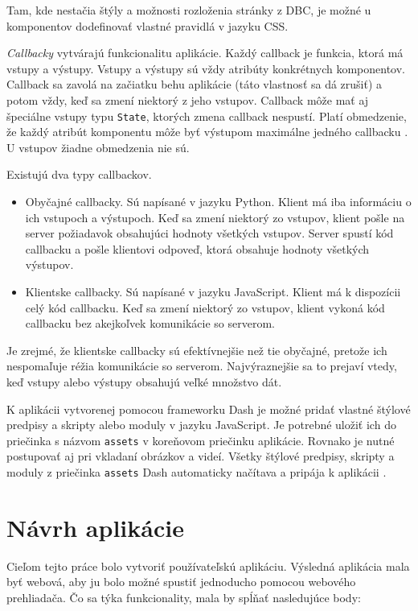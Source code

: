 Tam, kde nestačia štýly a možnosti rozloženia stránky z DBC, je možné u komponentov dodefinovať vlastné pravidlá v jazyku CSS.

\emph{Callbacky} vytvárajú funkcionalitu aplikácie. Každý callback je funkcia, ktorá má vstupy a výstupy. Vstupy a výstupy sú vždy atribúty konkrétnych komponentov. Callback sa zavolá na začiatku behu aplikácie (táto vlastnosť sa dá zrušiť) a potom vždy, keď sa zmení niektorý z jeho vstupov. Callback môže mať aj špeciálne vstupy typu \texttt{State}, ktorých zmena callback nespustí. Platí obmedzenie, že každý atribút komponentu môže byť výstupom maximálne jedného callbacku \cite{dash_documentation}. U vstupov žiadne obmedzenia nie sú.

Existujú dva typy callbackov.
\begin{itemize}
    \item Obyčajné callbacky. Sú napísané v jazyku Python. Klient má iba informáciu o ich vstupoch a výstupoch. Keď sa zmení niektorý zo vstupov, klient pošle na server požiadavok obsahujúci hodnoty všetkých vstupov. Server spustí kód callbacku a pošle klientovi odpoveď, ktorá obsahuje hodnoty všetkých výstupov.
    \item Klientske callbacky. Sú napísané v jazyku JavaScript. Klient má k dispozícii celý kód callbacku. Keď sa zmení niektorý zo vstupov, klient vykoná kód callbacku bez akejkoľvek komunikácie so serverom.
\end{itemize}

Je zrejmé, že klientske callbacky sú efektívnejšie než tie obyčajné, pretože ich nespomaľuje réžia komunikácie so serverom. Najvýraznejšie sa to prejaví vtedy, keď vstupy alebo výstupy obsahujú veľké množstvo dát.

K aplikácii vytvorenej pomocou frameworku Dash je možné pridať vlastné štýlové predpisy a skripty alebo moduly v jazyku JavaScript. Je potrebné uložiť ich do priečinka s názvom \texttt{assets} v koreňovom priečinku aplikácie. Rovnako je nutné postupovať aj pri vkladaní obrázkov a videí. Všetky štýlové predpisy, skripty a moduly z priečinka \texttt{assets} Dash automaticky načítava a pripája k aplikácii \cite{dash_documentation}.

\chapter{Návrh aplikácie}

Cieľom tejto práce bolo vytvoriť používateľskú aplikáciu. Výsledná aplikácia mala byť webová, aby ju bolo možné spustiť jednoducho pomocou webového prehliadača. Čo sa týka funkcionality, mala by spĺňať nasledujúce body:

